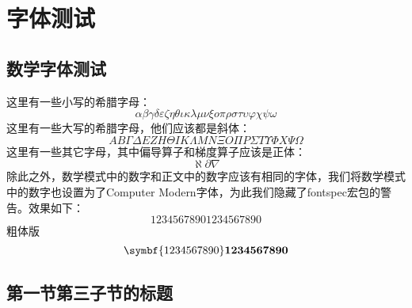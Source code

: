 
\section{字体测试}

\zhlipsum[1]

\subsection{数学字体测试}

这里有一些小写的希腊字母：
\begin{equation}
  \alpha \beta \gamma \delta \varepsilon \zeta \eta \theta \iota \kappa \lambda \mu \nu \xi o \pi \rho \sigma \tau \upsilon \varphi \chi \psi \omega
\end{equation}
这里有一些大写的希腊字母，他们应该都是斜体：
\begin{equation}
  A B \Gamma \Delta E Z H \Theta I K \Lambda M N \Xi O \Pi P \Sigma T \Upsilon \varPhi X \Psi \Omega
\end{equation}
这里有一些其它字母，其中偏导算子和梯度算子应该是正体：
\begin{equation}
  \aleph \partial \nabla
\end{equation}
除此之外，数学模式中的数字和正文中的数字应该有相同的字体，我们将数学模式中的数字也设置为了Computer Modern字体，为此我们隐藏了fontspec宏包的警告。效果如下：
\begin{equation}
  1234567890\text{1234567890}
\end{equation}
粗体版
\begin{equation}
  \symbf{1234567890}\text{\textbf{1234567890}}
\end{equation}

\subsection{第一节第三子节的标题}

\zhlipsum
